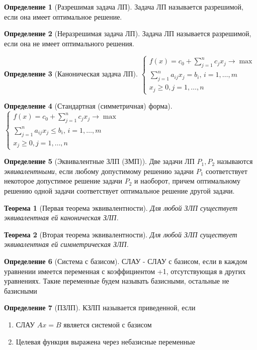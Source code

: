 \documentclass[a4paper]{article}
\newtheorem{theorem}{Теорема}[section]
\theoremstyle{definition}
\newtheorem*{definition}{Определение}
\theoremstyle{remark}
\begin{document}
\begin{definition}[Разрешимая задача ЛП]
	Задача ЛП называется разрешимой, если она имеет оптимальное решение.
\end{definition}
\begin{definition}[Неразрешимая задача ЛП]
	Задача ЛП называется разрешимой, если она не имеет оптимального решения.
\end{definition}
\begin{definition}[Каноническая задача ЛП]
	$\begin{cases}
			f(x) = c_0 + \sum_{j = 1}^n c_j x_j \to \max        \\
			\sum_{j = 1}^{n} a_{ij}x_j =b_i, \, i = 1, \dots, m \\
			x_j \geq 0, j = 1, \dots, n
		\end{cases}$
\end{definition}
\begin{definition}[Стандартная (симметричная) форма]
	$\begin{cases}
			f(x) = c_0 + \sum_{j = 1}^n c_j x_j \to \max     \\
			\sum_{j = 1}^{n} a_{ij}x_j \leq b_i, \, i = 1, \dots, m \\
			x_j \geq 0, j = 1, \dots, n
		\end{cases}$
\end{definition}
\begin{definition}[Эквивалентные ЗЛП (ЗМП)]
	Две задачи ЛП $P_1, P_2$ называются \textit{эквивалентными}, если любому допустимому решению задачи $P_1$ соответствует некоторое допустимое решение задачи $P_2$ и наоборот, причем оптимальному решению одной задачи соответствует оптимальное решение другой задачи.
\end{definition}
\begin{theorem}[Первая теорема эквивалентности]
	Для любой ЗЛП существует эквивалентная ей каноническая ЗЛП.
\end{theorem}
\begin{theorem}[Вторая теорема эквивалентности]
	Для любой ЗЛП существует эквивалентная ей симметрическая ЗЛП.
\end{theorem}
\begin{definition}[Система с базисом]
	СЛАУ - СЛАУ с базисом, если в каждом уравнении имеется переменная с коэффициентом +1, отсутствующая в других уравнениях. Такие переменные будем называть базисными, остальные не базисными
\end{definition}
\begin{definition}[ПЗЛП]
	КЗЛП называется приведенной, если
	\begin{enumerate}
		\item СЛАУ $Ax = B$ является системой с базисом
		\item Целевая функция выражена через небазисные переменные
	\end{enumerate}
\end{definition}
\end{document}
